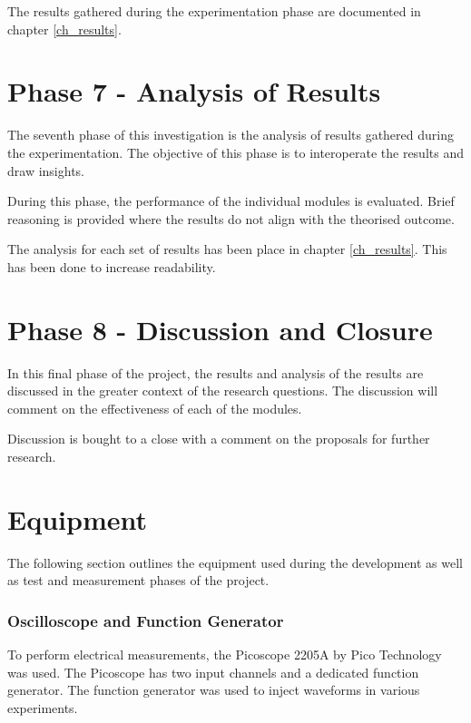 The results gathered during the experimentation phase are documented in chapter \ref{ch_results}.


\section{Phase 7 - Analysis of Results}

The seventh phase of this investigation is the analysis of results gathered during the experimentation. The objective of this phase is to interoperate the results and draw insights.

During this phase, the performance of the individual modules is evaluated. Brief reasoning is provided where the results do not align with the theorised outcome.

The analysis for each set of results has been place in chapter \ref{ch_results}. This has been done to increase readability.



\section{Phase 8 - Discussion and Closure}

In this final phase of the project, the results and analysis of the results are discussed in the greater context of the research questions. The discussion will comment on the effectiveness of each of the modules. 

Discussion is bought to a close with a comment on the  proposals for further research.




\section{Equipment}
\label{sec:test_and_measurement_equipment}
The following section outlines the equipment used during the development as well as test and measurement phases of the project.

\subsubsection{Oscilloscope and Function Generator}
To perform electrical measurements, the Picoscope 2205A by Pico Technology was used. The Picoscope has two input channels and a dedicated function generator. The function generator was used to inject waveforms in various experiments.

